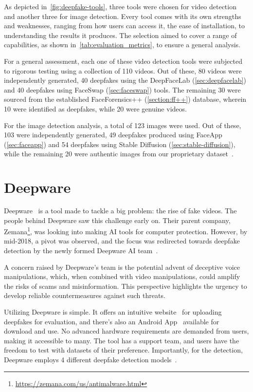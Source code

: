 As depicted in~\autoref{fig:deepfake-tools}, three tools were chosen for video
detection and another three for image detection. Every tool comes with its own
strengths and weaknesses, ranging from how users can access it, the ease of
installation, to understanding the results it produces. The selection aimed to
cover a range of capabilities, as shown in~\autoref{tab:evaluation_metrics},
to ensure a general analysis.

For a general assessment, each one of these video detection tools were subjected
to rigorous testing using a collection of 110 videos. Out of these, 80 videos were independently
generated, 40 deepfakes using the DeepFaceLab (\autoref{sec:deepfacelab}) and 40
deepfakes using FaceSwap (\autoref{sec:faceswap}) tools. The remaining 30 were sourced
from the established FaceForensics++ (\autoref{section:ff++})
database, wherein 10 were identified as deepfakes, while 20 were genuine videos.

For the image detection analysis, a total of 123 images were used. Out of
these, 103 were independently generated, 49 deepfakes produced using FaceApp (\autoref{sec:faceapp})
and 54 deepfakes using Stable Diffusion (\autoref{sec:stable-diffusion}), while the
remaining 20 were authentic images from our proprietary dataset~\cite{my-github-dataset}.

\section{Deepware}\label{sec:deepware}
Deepware~\cite{deepware-ai} is a tool made to tackle a big
problem: the rise of fake videos. The people behind
Deepware saw this challenge early on. Their parent company,
Zemana\footnote{\url{https://zemana.com/us/antimalware.html}},
was looking into making \ac{AI} tools for computer protection. However,
by mid-2018, a pivot was observed, and the focus was redirected towards
deepfake detection by the newly formed Deepware \ac{AI} team~\cite{deepware-ai-about}.

A concern raised by Deepware's team is the potential advent of deceptive
voice manipulations, which, when combined with video manipulations, could
amplify the risks of scams and misinformation. This perspective highlights
the urgency to develop reliable countermeasures against such threats.

Utilizing Deepware is simple. It offers an intuitive website~\cite{deepware-ai} for uploading
deepfakes for evaluation, and there's also an Android App~\cite{deepware-android-app}
available for download and use. No advanced hardware requirements are demanded from users,
making it accessible to many. The tool has a support team, and users have
the freedom to test with datasets of their preference. Importantly,
for the detection, Deepware employs 4 different deepfake detection models~\cite{10.1145/3543873.3587581}.


